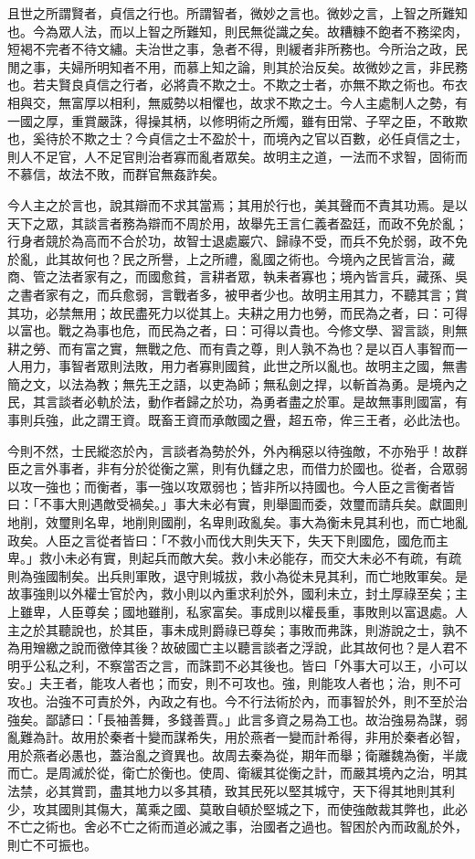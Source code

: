 \begin{pinyinscope}
且世之所謂賢者，貞信之行也。所謂智者，微妙之言也。微妙之言，上智之所難知也。今為眾人法，而以上智之所難知，則民無從識之矣。故糟糠不飽者不務梁肉，短褐不完者不待文繡。夫治世之事，急者不得，則緩者非所務也。今所治之政，民閒之事，夫婦所明知者不用，而慕上知之論，則其於治反矣。故微妙之言，非民務也。若夫賢良貞信之行者，必將貴不欺之士。不欺之士者，亦無不欺之術也。布衣相與交，無富厚以相利，無威勢以相懼也，故求不欺之士。今人主處制人之勢，有一國之厚，重賞嚴誅，得操其柄，以修明術之所燭，雖有田常、子罕之臣，不敢欺也，奚待於不欺之士？今貞信之士不盈於十，而境內之官以百數，必任貞信之士，則人不足官，人不足官則治者寡而亂者眾矣。故明主之道，一法而不求智，固術而不慕信，故法不敗，而群官無姦詐矣。

今人主之於言也，說其辯而不求其當焉；其用於行也，美其聲而不責其功焉。是以天下之眾，其談言者務為辯而不周於用，故舉先王言仁義者盈廷，而政不免於亂；行身者競於為高而不合於功，故智士退處巖穴、歸祿不受，而兵不免於弱，政不免於亂，此其故何也？民之所譽，上之所禮，亂國之術也。今境內之民皆言治，藏商、管之法者家有之，而國愈貧，言耕者眾，執耒者寡也；境內皆言兵，藏孫、吳之書者家有之，而兵愈弱，言戰者多，被甲者少也。故明主用其力，不聽其言；賞其功，必禁無用；故民盡死力以從其上。夫耕之用力也勞，而民為之者，曰：可得以富也。戰之為事也危，而民為之者，曰：可得以貴也。今修文學、習言談，則無耕之勞、而有富之實，無戰之危、而有貴之尊，則人孰不為也？是以百人事智而一人用力，事智者眾則法敗，用力者寡則國貧，此世之所以亂也。故明主之國，無書簡之文，以法為教；無先王之語，以吏為師；無私劍之捍，以斬首為勇。是境內之民，其言談者必軌於法，動作者歸之於功，為勇者盡之於軍。是故無事則國富，有事則兵強，此之謂王資。既畜王資而承敵國之舋，超五帝，侔三王者，必此法也。

今則不然，士民縱恣於內，言談者為勢於外，外內稱惡以待強敵，不亦殆乎！故群臣之言外事者，非有分於從衡之黨，則有仇讎之忠，而借力於國也。從者，合眾弱以攻一強也；而衡者，事一強以攻眾弱也；皆非所以持國也。今人臣之言衡者皆曰：「不事大則遇敵受禍矣。」事大未必有實，則舉圖而委，效璽而請兵矣。獻圖則地削，效璽則名卑，地削則國削，名卑則政亂矣。事大為衡未見其利也，而亡地亂政矣。人臣之言從者皆曰：「不救小而伐大則失天下，失天下則國危，國危而主卑。」救小未必有實，則起兵而敵大矣。救小未必能存，而交大未必不有疏，有疏則為強國制矣。出兵則軍敗，退守則城拔，救小為從未見其利，而亡地敗軍矣。是故事強則以外權士官於內，救小則以內重求利於外，國利未立，封土厚祿至矣；主上雖卑，人臣尊矣；國地雖削，私家富矣。事成則以權長重，事敗則以富退處。人主之於其聽說也，於其臣，事未成則爵祿已尊矣；事敗而弗誅，則游說之士，孰不為用矰繳之說而徼倖其後？故破國亡主以聽言談者之浮說，此其故何也？是人君不明乎公私之利，不察當否之言，而誅罰不必其後也。皆曰「外事大可以王，小可以安。」夫王者，能攻人者也；而安，則不可攻也。強，則能攻人者也；治，則不可攻也。治強不可責於外，內政之有也。今不行法術於內，而事智於外，則不至於治強矣。鄙諺曰：「長袖善舞，多錢善賈。」此言多資之易為工也。故治強易為謀，弱亂難為計。故用於秦者十變而謀希失，用於燕者一變而計希得，非用於秦者必智，用於燕者必愚也，蓋治亂之資異也。故周去秦為從，期年而舉；衛離魏為衡，半歲而亡。是周滅於從，衛亡於衡也。使周、衛緩其從衡之計，而嚴其境內之治，明其法禁，必其賞罰，盡其地力以多其積，致其民死以堅其城守，天下得其地則其利少，攻其國則其傷大，萬乘之國、莫敢自頓於堅城之下，而使強敵裁其弊也，此必不亡之術也。舍必不亡之術而道必滅之事，治國者之過也。智困於內而政亂於外，則亡不可振也。


\end{pinyinscope}
